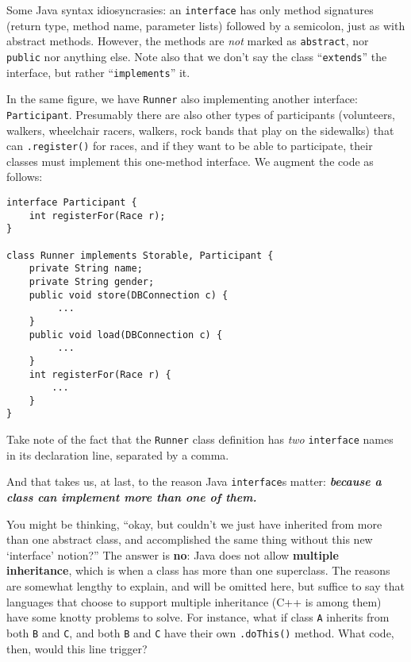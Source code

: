 Some Java syntax idiosyncrasies: an \texttt{interface} has only method
signatures (return type, method name, parameter lists) followed by a
semicolon, just as with abstract methods. However, the methods are
\textit{not} marked as \texttt{abstract}, nor \texttt{public} nor anything
else. Note also that we don't say the class ``\texttt{extends}'' the interface,
but rather ``\texttt{implements}'' it.

In the same figure, we have \texttt{Runner} also implementing another
interface: \texttt{Participant}. Presumably there are also other types of
participants (volunteers, walkers, wheelchair racers, walkers, rock bands that
play on the sidewalks) that can \texttt{.register()} for races, and if they
want to be able to participate, their classes must implement this one-method
interface. We augment the code as follows:

\begin{Verbatim}[fontsize=\scriptsize,samepage=true,frame=single]
interface Participant {
    int registerFor(Race r);
}

class Runner implements Storable, Participant {                        
    private String name;
    private String gender;
    public void store(DBConnection c) {
         ...
    }
    public void load(DBConnection c) {
         ...
    }
    int registerFor(Race r) {
        ...
    }
}                                            
\end{Verbatim}

Take note of the fact that the \texttt{Runner} class definition has
\textit{two} \texttt{interface} names in its declaration line, separated by a
comma. 

And that takes us, at last, to the reason Java \texttt{interface}s matter:
\textbf{\textit{because a class can implement more than one of them.}}

You might be thinking, ``okay, but couldn't we just have inherited from more
than one abstract class, and accomplished the same thing without this new
`interface' notion?'' The answer is \textbf{no}: Java does not allow
\textbf{multiple inheritance}, which is when a class has more than one
superclass. The reasons are somewhat lengthy to explain, and will be omitted
here, but suffice to say that languages that choose to support multiple
inheritance (C++ is among them) have some knotty problems to solve. For
instance, what if class \texttt{A} inherits from both \texttt{B} and
\texttt{C}, and both \texttt{B} and \texttt{C} have their own
\texttt{.doThis()} method. What code, then, would this line trigger?

